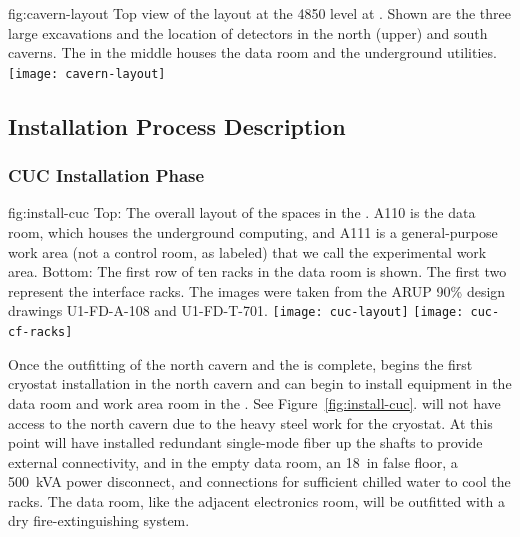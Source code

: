 \begin{dunefigure}{fig:cavern-layout}
  {Top view of the layout at the 4850 level at . Shown are the three large excavations and the location of detectors in %
  the north (upper) and south caverns. %
  The  in the middle %
  houses the  data room and the underground utilities.}
\texttt{[image: cavern-layout]}
\end{dunefigure}

\subsection{Installation Process Description}
\label{sec:fdsp-tc-inst-proc}


\subsubsection{CUC Installation Phase}
\label{sec:fdsp-tc-inst-CUC}

\begin{dunefigure}{fig:install-cuc}
  {Top: The overall layout of the  spaces in the . A110 is the  data room, which houses the underground computing, and A111 is a general-purpose work area (not a control room, as labeled) that we call the experimental work area. Bottom: The first row of ten racks in the data room is shown. The first two represent the  interface racks. The images were taken from the ARUP 90\% design drawings U1-FD-A-108 and U1-FD-T-701.
  }
\texttt{[image: cuc-layout]}
\vspace{-2pt}
\texttt{[image: cuc-cf-racks]}
\end{dunefigure}

 
Once the   outfitting of the north cavern and the  is complete,   begins the first cryostat installation in the north cavern and  can begin to install equipment in the data room and work area room in the . See Figure~\ref{fig:install-cuc}.   will not have access to the north cavern due to the heavy steel work for the cryostat. 
At this point    will have installed redundant single-mode fiber up the shafts to provide external connectivity, and in the empty data room,  an \SI{18}{in} false floor, a \SI{500}{kVA} power disconnect, and connections for sufficient chilled water to cool the racks. The data room, like the adjacent  electronics room, will be outfitted with a dry fire-extinguishing system. 
 

